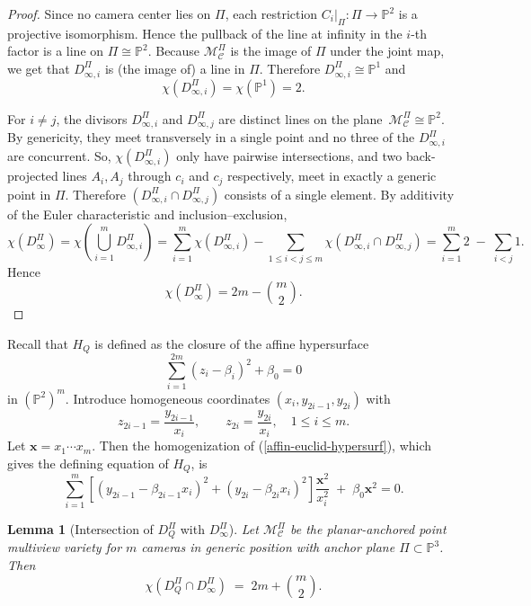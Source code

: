 \documentclass{article}
\newtheorem{lemma}{Lemma}
\newcommand{\PP}{\mathbb{P}}
\begin{document}
\begin{proof}
Since no camera center lies on $\Pi$, each restriction
$C_{i}\bigr|_{\Pi}:\Pi\to\PP^{2}$ is a projective isomorphism.
Hence the pullback of the line at infinity in the $i$-th factor is a line on
$\Pi\cong\PP^{2}$. Because $\mathcal{M}^{\Pi}_{\mathcal{C}}$ is the image of $\Pi$ under the joint
map, we get that $D_{\infty,i}^{\Pi}$ is (the image of) a line in $\Pi$.
Therefore $D_{\infty,i}^{\Pi}\cong\PP^{1}$ and
\[
\chi\!\left(D_{\infty,i}^{\Pi}\right)=\chi(\PP^{1})=2.
\]

\smallskip
For $i\neq j$, the divisors $D_{\infty,i}^{\Pi}$ and $D_{\infty,j}^{\Pi}$
are distinct lines on the plane~\mbox{$\mathcal{M}^{\Pi}_{\mathcal{C}}\cong\PP^{2}$.}
By genericity, they meet transversely in a single point and no three of the
$D_{\infty,i}^{\Pi}$ are concurrent. So, $\chi\!\left(D_{\infty,i}^{\Pi}\right)$ only have pairwise intersections, and two back-projected lines $A_i, A_j$ through $c_i$ and $c_j$ respectively, meet in exactly a generic point in $\Pi.$ Therefore $\left(D_{\infty,i}^{\Pi}\cap D_{\infty,j}^{\Pi}\right)$ consists of a single element. By additivity of the Euler characteristic and
inclusion--exclusion,
\[
\chi\!\left(D_{\infty}^{\Pi}\right)
=\chi\!\left(\bigcup_{i=1}^{m} D_{\infty,i}^{\Pi}\right)
=\sum_{i=1}^{m}\chi\!\left(D_{\infty,i}^{\Pi}\right)
-\sum_{1\le i<j\le m}\chi\!\left(D_{\infty,i}^{\Pi}\cap D_{\infty,j}^{\Pi}\right)
= \sum_{i=1}^{m} 2 \;-\; \sum_{i<j} 1.
\]
Hence
\[
\chi\!\left(D_{\infty}^{\Pi}\right)
=2m-\binom{m}{2}.
\]
\end{proof}
Recall that $H_Q$ is defined as the closure of the affine hypersurface
\[\label{affin-euclid-hypersurf}
\sum_{i=1}^{2m} (z_i - \beta_i)^2 + \beta_0 = 0
\tag{2}
\]
in $(\mathbb{P}^2)^m$.  
Introduce homogeneous coordinates $(x_i, y_{2i-1}, y_{2i})$ with 
\[
z_{2i-1} = \frac{y_{2i-1}}{x_i}, 
\qquad 
z_{2i}   = \frac{y_{2i}}{x_i}, 
\quad 1 \leq i \leq m.
\]
Let $\mathbf{x} = x_1 \cdots x_m$.  
Then the homogenization of (\ref{affin-euclid-hypersurf}), which gives the defining equation of $H_Q$, is
\[
\sum_{i=1}^m 
\left[ (y_{2i-1} - \beta_{2i-1} x_i)^2 + (y_{2i} - \beta_{2i} x_i)^2 \right] 
\frac{\mathbf{x}^2}{x_i^2} 
\;+\; \beta_0 \mathbf{x}^2 = 0.
\tag{3}
\]

\begin{lemma}[Intersection of $D_{Q}^{\Pi}$ with $D_{\infty}^{\Pi}$]
\label{lem:DQ-infty-plane}
Let $\mathcal{M}^\Pi_{\mathcal{C}}$ be the planar-anchored point multiview variety 
for $m$ cameras in generic position with anchor plane $\Pi \subset \PP^3$.
Then
\[
\chi\!\left(D_{Q}^{\Pi}\cap D_{\infty}^{\Pi}\right) \;=\; 2m + \binom{m}{2}.
\]
\end{lemma}
\end{document}
